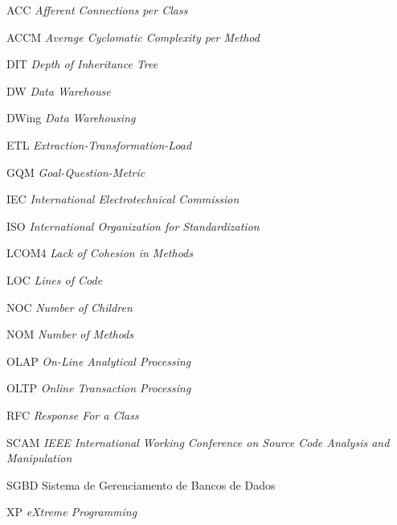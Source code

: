 \begin{siglas}

\item [ACC]   \textit{Afferent Connections per Class}
\item [ACCM]  \textit{Average Cyclomatic Complexity per Method}
\item [DIT]	  \textit{Depth of Inheritance Tree}
\item [DW]	  \textit{Data Warehouse}
\item [DWing] \textit{Data Warehousing}
\item [ETL]   \textit{Extraction-Transformation-Load}
\item [GQM]   \textit{Goal-Question-Metric}
\item [IEC]   \textit{International Electrotechnical Commission}
\item [ISO]   \textit{International Organization for Standardization}
\item [LCOM4] \textit{Lack of Cohesion in Methods}
\item [LOC]   \textit{Lines of Code}
\item [NOC]   \textit{Number of Children}
\item [NOM]   \textit{Number of Methods}
\item [OLAP]  \textit{On-Line Analytical Processing}
\item [OLTP]  \textit{Online Transaction Processing}
\item [RFC]   \textit{Response For a Class}
\item [SCAM]  \textit{IEEE International Working Conference on Source Code Analysis and Manipulation}
\item [SGBD]  Sistema de Gerenciamento de Bancos de Dados
\item [XP]    \textit{eXtreme Programming}
  
\end{siglas}
